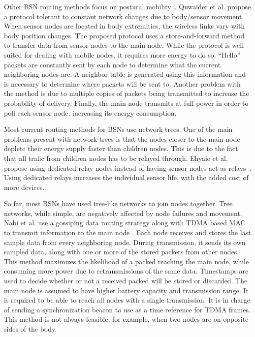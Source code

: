 Other BSN routing methods focus on postural mobility~\cite{routing:storeandforward}. Quwaider et al. propose a protocol tolerant to constant network changes due to body/sensor movement. When sensor nodes are located in body extremities, the wireless links vary with body position changes. The proposed protocol uses a store-and-forward method to transfer data from sensor nodes to the main node. While the protocol is well suited for dealing with mobile nodes, it requires more energy to do so. ``Hello'' packets are constantly sent by each node to determine what the current neighboring nodes are. A neighbor table is generated using this information and is necessary to determine where packets will be sent to. Another problem with the method is due to multiple copies of packets being transmitted to increase the probability of delivery. Finally, the main node transmits at full power in order to poll each sensor node, increasing its energy consumption.

Most current routing methods for BSNs use network trees. One of the main problems present with network trees is that the nodes closer to the main node deplete their energy supply faster than children nodes. This is due to the fact that all trafic from children nodes has to be relayed through. Ehyaie et al. propose using dedicated relay nodes instead of having sensor nodes act as relays~\cite{relay:networklife}. Using dedicated relays increases the individual sensor life, with the added cost of more devices.

So far, most BSNs have used tree-like networks to join nodes together. Tree networks, while simple, are negatively affected by node failures and movement.  Nabi et al. use a gossiping data routing strategy along with TDMA based MAC to transmit information to the main node \cite{relay:transmitpoweradaptation}. Each node receives and stores the last sample data from every neighboring node. During transmission, it sends its own sampled data, along with one or more of the stored packets from other nodes. This method maximizes the likelihood of a packed reaching the main node, while consuming more power due to retransmissions of the same data. Timestamps are used to decide whether or not a received packed will be stored or discarded. The main node is assumed to have higher battery capacity and transmission range. It is required to be able to reach all nodes with a single transmission. It is in charge of sending a synchronization beacon to use as a time reference for TDMA frames. This method is not always feasible, for example, when two nodes are on opposite sides of the body.

